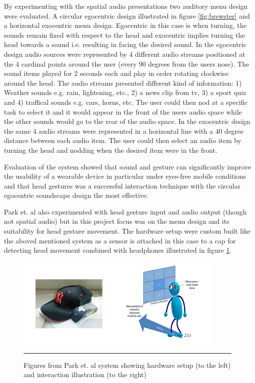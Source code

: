 By experimenting with the spatial audio presentations two auditory menu design were evaluated. A circular egocentric design illustrated in figure \ref{fig:brewster} and a horizontal exocentric menu design. Egocentric in this case is when turning, the sounds remain fixed with respect to the head and exocentric implies turning the head towards a sound i.e. resulting in facing the desired sound. In the egocentric design audio sources were represented by 4 different audio streams positioned at the 4 cardinal points around the user (every 90 degrees from the users nose). The sound items played for 2 seconds each and play in order rotating clockwise around the head. The audio streams presented different kind of information: 1) Weather sounds e.g. rain, lightening, etc., 2) a news clip from tv, 3) a sport quiz and 4) traffical sounds e.g. cars, horns, etc. The user could then nod at a specific task to select it and it would appear in the front of the users audio space while the other sounds would go to the rear of the audio space. In the exocentric design the same 4 audio streams were represented in a horizontal line with a 40 degree distance between each audio item. The user could then select an audio item by turning the head and nodding when the desired item were in the front.

Evaluation of the system showed that sound and gesture can significantly improve the usability of a wearable device in particular under eyes-free mobile conditions and that head gestures was a successful interaction technique with the circular egocentric soundscape design the most effective.

Park et. al \cite{park_gaze-directed_2011} also experimented with head gesture input and audio output (though not spatial audio) but in this project focus was on the menu design and its suitability for head gesture movement. The hardware setup were custom built like the aboved mentioned system as a sensor is attached in this case to a cap for detecting head movement combined with headphones illustrated in figure \ref{fig:park}.

\begin{figure}[t]
	\centering
		\includegraphics[width=0.9\textwidth,height=\textheight,keepaspectratio]{./Figures/park-system.png}
		\rule{35em}{0.5pt}
	\caption[Park system]{Figures from Park et. al \cite{park_gaze-directed_2011} system showing hardware setup (to the left) and interaction illustration (to the right)}
	\label{fig:park}
\end{figure}


